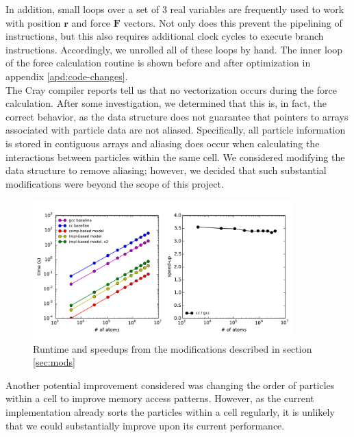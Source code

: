 \documentclass[12pt]{article}
\begin{document}
\noindent In addition, small loops over a set of 3 real variables are frequently used to
work with position $\bm{r}$ and force $\textbf{F}$ vectors. Not only does this prevent the pipelining
of instructions, but this also requires additional clock cycles to execute branch instructions.
Accordingly, we unrolled all of these loops by hand. The inner loop of the force calculation 
routine is shown before and after optimization in appendix \ref{apd:code-changes}. \\

\noindent The Cray compiler reports tell us that no vectorization occurs
during the force calculation. After some investigation, we determined that 
this is, in fact, the correct behavior, as the data structure does not
guarantee that pointers to arrays associated with particle data are not aliased. 
Specifically, all particle information is stored in contiguous arrays and aliasing does occur
when calculating the interactions between particles within the same cell. We
considered modifying the data structure to remove aliasing; however, we decided 
that such substantial modifications were beyond the scope of this project. \\

\begin{figure}[h!]
  \centering
  \includegraphics[width=0.9\textwidth]{../figs/compiler_forceLJ.pdf}
  \caption{Runtime and speedups from the modifications described in
   section \ref{sec:mods}}
   \label{fig:mod-force}
\end{figure}

\noindent Another potential improvement considered was changing the order of
particles within a cell to improve memory access patterns. However, as the
current implementation already sorts the particles within a cell regularly, it is unlikely 
that we could substantially improve upon its current performance. \\
\end{document}
